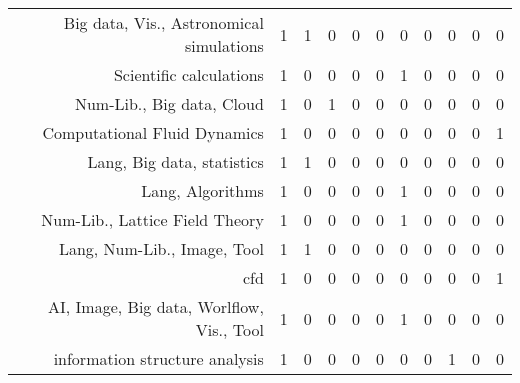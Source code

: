 {\begin{landscape}
\begin{longtable}[htb]{r|c|c|c|c|c|c|c|c|c|c}
{Big data, Vis., Astronomical simulations} & 1 & 1 & 0 & 0 & 0 & 0 & 0 & 0 & 0 & 0 \\%
{Scientific calculations} & 1 & 0 & 0 & 0 & 0 & 1 & 0 & 0 & 0 & 0 \\%
{Num-Lib., Big data, Cloud} & 1 & 0 & 1 & 0 & 0 & 0 & 0 & 0 & 0 & 0 \\%
{Computational Fluid Dynamics} & 1 & 0 & 0 & 0 & 0 & 0 & 0 & 0 & 0 & 1 \\%
{Lang, Big data, statistics} & 1 & 1 & 0 & 0 & 0 & 0 & 0 & 0 & 0 & 0 \\%
{Lang, Algorithms} & 1 & 0 & 0 & 0 & 0 & 1 & 0 & 0 & 0 & 0 \\%
{Num-Lib., Lattice Field Theory} & 1 & 0 & 0 & 0 & 0 & 1 & 0 & 0 & 0 & 0 \\%
{Lang, Num-Lib., Image, Tool} & 1 & 1 & 0 & 0 & 0 & 0 & 0 & 0 & 0 & 0 \\%
{cfd} & 1 & 0 & 0 & 0 & 0 & 0 & 0 & 0 & 0 & 1 \\%
{AI, Image, Big data, Worlflow, Vis., Tool} & 1 & 0 & 0 & 0 & 0 & 1 & 0 & 0 & 0 & 0 \\%
{information structure analysis} & 1 & 0 & 0 & 0 & 0 & 0 & 0 & 1 & 0 & 0 \\%
\hline%
\end{longtable}%
\end{landscape}}%
\clearpage%
